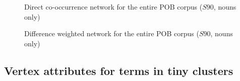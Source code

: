 \clearpage
\begin{figure}
    \centerfloat
    
    \caption[Global direct co-occurrence network]{
        Direct co-occurrence network for the entire POB corpus ($S90$, nouns only)
    }
    \label{fig:global_ppmi}
\end{figure}

\clearpage
\begin{figure}
    \centerfloat
    
    \caption[Global difference weighted network]{
        Difference weighted network for the entire POB corpus ($S90$, nouns only)
    }
    \label{fig:global_difw}
\end{figure}

\clearpage
\subsection{Vertex attributes for terms in tiny clusters}


